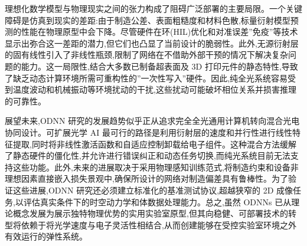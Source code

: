理想化数学模型与物理现实之间的张力构成了阻碍广泛部署的主要局限。一个关键障碍是仿真到现实的差距:由于制造公差、表面粗糙度和材料色散,标量衍射模型预测的性能在物理原型中会下降。尽管硬件在环(HIL)优化和对准误差''免疫''等技术显示出弥合这一差距的潜力,但它们也凸显了当前设计的脆弱性。此外,无源衍射层的固有线性引入了非线性瓶颈,限制了网络在不借助外部干预的情况下解决复杂问题的能力。这一局限性,结合大多数已制备超表面及 3D 打印元件的静态特性,导致了缺乏动态计算环境所需可重构性的''一次性写入''硬件。因此,纯全光系统容易受到温度波动和机械振动等环境扰动的干扰,这些扰动可能破坏相位关系并损害推理的可靠性。

展望未来,ODNN 研究的发展趋势似乎正从追求完全全光通用计算机转向混合光电协同设计。可扩展光学 AI 最可行的路径是利用衍射层的速度和并行性进行线性特征提取,同时将非线性激活函数和自适应控制卸载给电子组件。这种混合方法缓解了静态硬件的僵化性,并允许进行错误纠正和动态任务切换,而纯光系统目前无法支持这些功能。此外,未来的进展取决于采用物理感知训练范式,将制造约束和设备非理想因素直接嵌入损失景观中,确保所设计的网络对制造偏差具有鲁棒性。为了验证这些进展,ODNN 研究还必须建立标准化的基准测试协议,超越狭窄的 2D 成像任务,以评估真实条件下的时空动力学和体数据处理能力。总之,虽然 ODNNs 已从理论概念发展为展示独特物理优势的实用实验室原型,但其向稳健、可部署技术的转型将依赖于将光学速度与电子灵活性相结合,从而创建能够在受控实验室环境之外有效运行的弹性系统。
